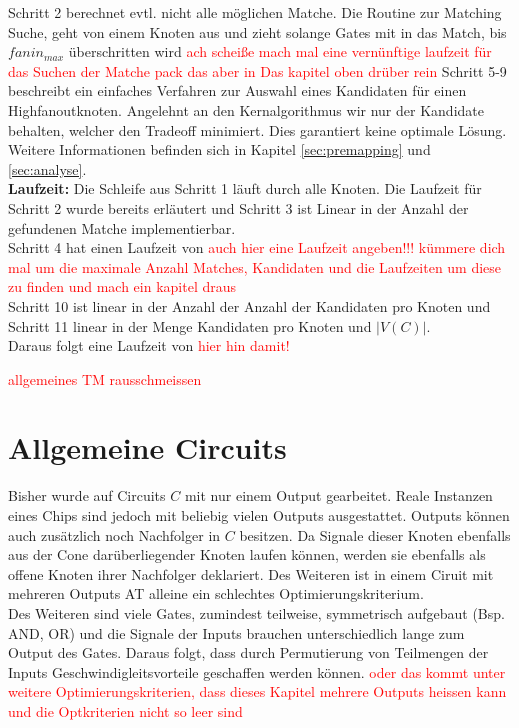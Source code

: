\documentclass[11pt, a4paper, german]{article}
\begin{document}
Schritt 2 berechnet evtl. nicht alle möglichen Matche. Die Routine zur Matching Suche, geht von einem Knoten aus und zieht solange Gates mit in das Match, bis $fanin_{max}$ überschritten wird \textcolor{red}{ach scheiße mach mal eine vernünftige laufzeit für das Suchen der Matche pack das aber in Das kapitel oben drüber rein}
Schritt 5-9 beschreibt ein einfaches Verfahren zur Auswahl eines Kandidaten für einen Highfanoutknoten. Angelehnt an den Kernalgorithmus wir nur der Kandidate behalten, welcher den Tradeoff minimiert. Dies garantiert keine optimale Lösung. Weitere Informationen befinden sich in Kapitel \ref{sec:premapping} und \ref{sec:analyse}. \\
{\bf Laufzeit: } Die Schleife aus Schritt 1 läuft durch alle Knoten. Die Laufzeit für Schritt 2 wurde bereits erläutert und Schritt 3 ist Linear in der Anzahl der gefundenen Matche implementierbar. \\
Schritt 4 hat einen Laufzeit von \textcolor{red}{auch hier eine Laufzeit angeben!!! kümmere dich mal um die maximale Anzahl Matches, Kandidaten und die Laufzeiten um diese zu finden und mach ein kapitel draus }\\
Schritt 10 ist linear in der Anzahl der Anzahl der Kandidaten pro Knoten und Schritt 11 linear in der Menge Kandidaten pro Knoten und $|V(C)|$.\\
Daraus folgt eine Laufzeit von \textcolor{red}{hier hin damit!}

\textcolor{red}{allgemeines TM rausschmeissen}


\section{Allgemeine Circuits}
Bisher wurde auf Circuits $C$ mit nur einem Output gearbeitet. Reale Instanzen eines Chips sind jedoch mit beliebig vielen Outputs ausgestattet. Outputs können auch zusätzlich noch Nachfolger in $C$ besitzen. Da Signale dieser Knoten ebenfalls aus der Cone darüberliegender Knoten laufen können, werden sie ebenfalls als offene Knoten ihrer Nachfolger deklariert. Des Weiteren ist in einem Ciruit mit mehreren Outputs AT alleine ein schlechtes Optimierungskriterium. \\
Des Weiteren sind viele Gates, zumindest teilweise, symmetrisch aufgebaut (Bsp. AND, OR) und die Signale der Inputs brauchen unterschiedlich lange zum Output des Gates. Daraus folgt, dass durch Permutierung von Teilmengen der Inputs Geschwindigleitsvorteile geschaffen werden können. 
\textcolor{red}{oder das kommt unter weitere Optimierungskriterien, dass dieses Kapitel mehrere Outputs heissen kann und die Optkriterien nicht so leer sind}
\end{document}
